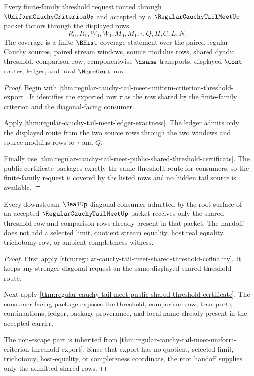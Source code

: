 \begin{theorem}
\label{thm:regular-cauchy-tail-meet-family-threshold-coverage}
Every finite-family threshold request routed through $\UniformCauchyCriterionUp$ and accepted by a $\RegularCauchyTailMeetUp$ packet factors through the displayed rows
$$
R_0,R_1,W_0,W_1,M_0,M_1,\tau,Q,H,C,L,N.
$$
The coverage is a finite $\BHist$ coverage statement over the paired regular-Cauchy sources, paired stream windows, source modulus rows, shared dyadic threshold, comparison row, componentwise $\hsame$ transports, displayed $\Cont$ routes, ledger, and local $\NameCert$ row.
\end{theorem}
\begin{proof}
Begin with \autoref{thm:regular-cauchy-tail-meet-uniform-criterion-threshold-export}. It identifies the exported row $\tau$ as the row shared by the finite-family criterion and the diagonal-facing consumer.

Apply \autoref{thm:regular-cauchy-tail-meet-ledger-exactness}. The ledger admits only the displayed route from the two source rows through the two windows and source modulus rows to $\tau$ and $Q$.

Finally use \autoref{thm:regular-cauchy-tail-meet-public-shared-threshold-certificate}. The public certificate packages exactly the same threshold route for consumers, so the finite-family request is covered by the listed rows and no hidden tail source is available.
\end{proof}

\begin{theorem}
\label{thm:regular-cauchy-tail-meet-root-unblock-handoff}
Every downstream $\RealUp$ diagonal consumer admitted by the root surface of an accepted $\RegularCauchyTailMeetUp$ packet receives only the shared threshold row and comparison rows already present in that packet. The handoff does not add a selected limit, quotient stream equality, host real equality, trichotomy row, or ambient completeness witness.
\end{theorem}
\begin{proof}
First apply \autoref{thm:regular-cauchy-tail-meet-shared-threshold-cofinality}. It keeps any stronger diagonal request on the same displayed shared threshold route.

Next apply \autoref{thm:regular-cauchy-tail-meet-public-shared-threshold-certificate}. The consumer-facing package exposes the threshold, comparison row, transports, continuations, ledger, package provenance, and local name already present in the accepted carrier.

The non-escape part is inherited from \autoref{thm:regular-cauchy-tail-meet-uniform-criterion-threshold-export}. Since that export has no quotient, selected-limit, trichotomy, host-equality, or completeness coordinate, the root handoff supplies only the admitted shared rows.
\end{proof}


